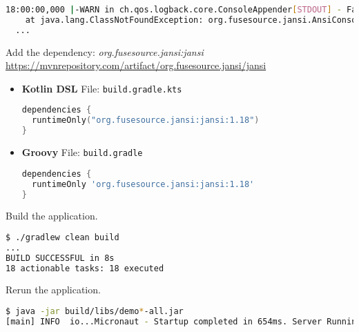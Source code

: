 \begin{enumerate}
\begin{lstlisting}[language=bash]
18:00:00,000 |-WARN in ch.qos.logback.core.ConsoleAppender[STDOUT] - Failed to create AnsiPrintStream. Falling back on the default stream. java.lang.ClassNotFoundException: org.fusesource.jansi.AnsiConsole
	at java.lang.ClassNotFoundException: org.fusesource.jansi.AnsiConsole
  ...
\end{lstlisting}

Add the dependency: \textit{org.fusesource.jansi:jansi}
\newline
{\footnotesize \url{https://mvnrepository.com/artifact/org.fusesource.jansi/jansi}}

\begin{itemize}

\item[] \textbf{Kotlin DSL}
\newline
File: \texttt{build.gradle.kts}

\begin{lstlisting}[language=Kotlin]
dependencies {
  runtimeOnly("org.fusesource.jansi:jansi:1.18")
}
\end{lstlisting}

\item[] \textbf{Groovy}
\newline
File: \texttt{build.gradle}

\begin{lstlisting}[language=Groovy]
dependencies {
  runtimeOnly 'org.fusesource.jansi:jansi:1.18'
}
\end{lstlisting}

\end{itemize}

Build the application.

\begin{lstlisting}[language=bash]
$ ./gradlew clean build
...
BUILD SUCCESSFUL in 8s
18 actionable tasks: 18 executed
\end{lstlisting}

Rerun the application.

\begin{lstlisting}[language=bash]
$ java -jar build/libs/demo*-all.jar
[main] INFO  io...Micronaut - Startup completed in 654ms. Server Running: http://localhost:8080
\end{lstlisting}

\end{enumerate}
